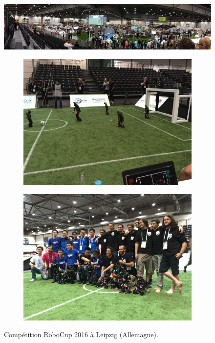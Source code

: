 \begin{figure}[htb]
    \centerfloat
    \includegraphics[trim={40cm 0cm 0cm 0cm},clip,width=1.30\linewidth]{../media/robocup_view.jpg}
    \begin{subfigure}{0.43\paperwidth}
        \centering
        \includegraphics[width=1.0\linewidth]{../media/robocup_field.jpg}
    \end{subfigure}
    \begin{subfigure}{0.43\paperwidth}
        \centering
        \includegraphics[width=1.0\linewidth]{../media/robocup_team.jpg}
    \end{subfigure}
    \caption{\label{fig:robocup} 
        Compétition RoboCup 2016 à Leipzig (Allemagne).
    }
\end{figure}

